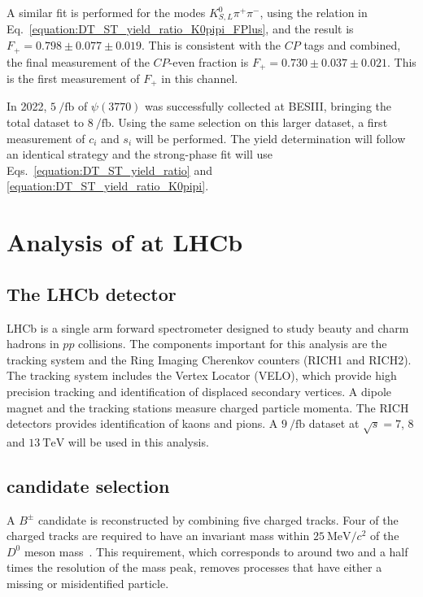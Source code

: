 \documentclass[12pt, a4paper, notitlepage, onecolumn]{article}
\begin{document}
A similar fit is performed for the modes $K^0_{S, L}\pi^+\pi^-$, using the relation in Eq.~\eqref{equation:DT_ST_yield_ratio_K0pipi_FPlus}, and the result is $F_+ = 0.798 \pm 0.077 \pm 0.019$. This is consistent with the $C\!P$ tags and combined, the final measurement of the $C\!P$-even fraction is $F_+ = 0.730 \pm 0.037 \pm 0.021$. This is the first measurement of $F_+$ in this channel.

In 2022, $\SI{5}{\per\femto\barn}$ of $\psi(3770)$ was successfully collected at BESIII, bringing the total dataset to $\SI{8}{\per\femto\barn}$. Using the same selection on this larger dataset, a first measurement of $c_i$ and $s_i$ will be performed. The yield determination will follow an identical strategy and the strong-phase fit will use Eqs.~\eqref{equation:DT_ST_yield_ratio} and \eqref{equation:DT_ST_yield_ratio_K0pipi}.

\section{Analysis of \texorpdfstring{}{B2DhD2KKpipi} at LHCb}
\subsection{The LHCb detector}
\noindent LHCb \cite{LHCb-DP-2008-001} is a single arm forward spectrometer designed to study beauty and charm hadrons in $pp$ collisions. The components important for this analysis are the tracking system and the Ring Imaging Cherenkov counters (RICH1 and RICH2). The tracking system includes the Vertex Locator (VELO), which provide high precision tracking and identification of displaced secondary vertices. A dipole magnet and the tracking stations measure charged particle momenta. The RICH detectors provides identification of kaons and pions. A $\SI{9}{\per\femto\barn}$ dataset at $\sqrt{s} = 7$, $8$ and $\SI{13}{\tera\eV}$ will be used in this analysis.

\subsection{\texorpdfstring{}{B2DhD2KKpipi} candidate selection}
\label{section:Candidate_selection}
\noindent A $B^\pm$ candidate is reconstructed by combining five charged tracks. Four of the charged tracks are required to have an invariant mass within $\SI{25}{\mega\eV/c^2}$ of the $D^0$ meson mass~\cite{pdg}. This requirement, which corresponds to around two and a half times the resolution of the mass peak, removes processes that have either a missing or misidentified particle.
\end{document}
